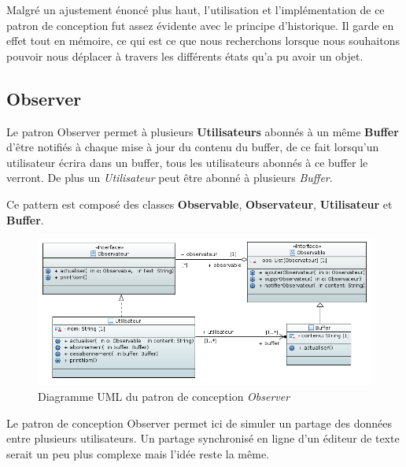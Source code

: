 \documentclass[a4paper,11pt]{article}
\begin{document}
\vspace{2cm}

\noindent Malgré un ajustement énoncé plus haut, l'utilisation et l'implémentation de ce patron de conception fut assez évidente avec le principe d'historique. Il garde en effet tout en mémoire, ce qui est ce que nous recherchons lorsque nous souhaitons pouvoir nous déplacer à travers les différents états qu'a pu avoir un objet.

\clearpage

%
%

\subsection{Observer}\label{subsec:observer}
Le patron Observer permet à plusieurs \textbf{Utilisateurs} abonnés à un même \textbf{Buffer} d'être notifiés à chaque mise à jour du contenu du buffer, de ce fait lorsqu'un utilisateur écrira dans un buffer, tous les utilisateurs abonnés à ce buffer le verront. De plus un \emph{Utilisateur} peut être abonné à plusieurs \emph{Buffer}.
\smallskip

\noindent Ce pattern est composé des classes \textbf{Observable}, \textbf{Observateur}, \textbf{Utilisateur} et \textbf{Buffer}.

\vspace{2cm}

\begin{figure}[h!]
   \centerline{\includegraphics[scale=0.7]{DiagrammeObserver.png}}
   \caption{\label{diaObserver} Diagramme UML du patron de conception \emph{Observer}}
\end{figure}

\vspace{2cm}

\noindent Le patron de conception Observer permet ici de simuler un partage des données entre plusieurs utilisateurs. Un partage synchronisé en ligne d'un éditeur de texte serait un peu plus complexe mais l'idée reste la même.
\clearpage
\end{document}
